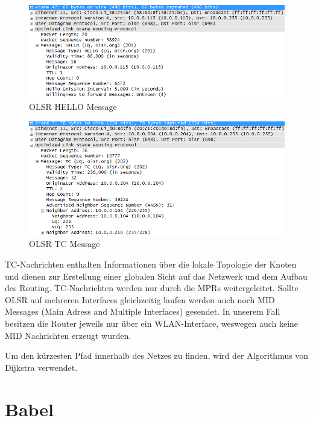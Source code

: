 \documentclass[10pt]{scrartcl}
\begin{document}
	\begin{figure}
        \centering
                \includegraphics[width=\textwidth]{img/olsr_hello_message_example}
        \caption{OLSR HELLO Message}
        \label{img:olsr_hello_message}
	\end{figure}
	
	
	\begin{figure}
        \centering
                \includegraphics[width=\textwidth]{img/olsr_tc_message_example}
        \caption{OLSR TC Message}
        \label{img:olsr_tc_message}
	\end{figure}
	
TC-Nachrichten enthalten Informationen über die lokale Topologie der Knoten und dienen zur Erstellung einer globalen Sicht auf das Netzwerk und dem Aufbau des Routing. TC-Nachrichten werden nur durch die MPRs weitergeleitet.
Sollte OLSR auf mehreren Interfaces gleichzeitig laufen werden auch noch MID Messages (Main Adress and Multiple Interfaces) gesendet. In unserem Fall besitzen die Router jeweils nur über ein WLAN-Interface, weswegen auch keine MID Nachrichten erzeugt wurden.

Um den kürzesten Pfad innerhalb des Netzes zu finden, wird der Algorithmus von Dijkstra verwendet.
    
    
    
\section{Babel}
\end{document}
